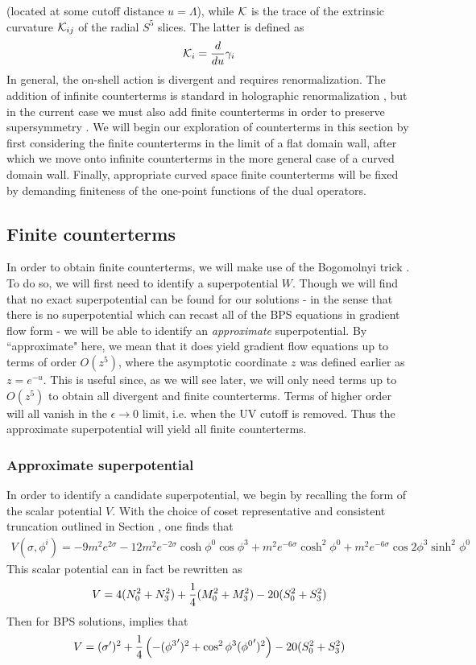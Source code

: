 \documentclass[12pt]{article}
\begin{document}
(located at some cutoff distance $u= \Lambda$), while ${\cal K}$ is the trace of the extrinsic curvature ${\cal K}_{ij}$ of the radial $S^5$ slices. The latter is defined as
\begin{eqnarray}
{\cal K}_{i}=\frac{d}{du} \gamma_{i}
\end{eqnarray}
In general, the on-shell action is divergent and requires renormalization. The addition of infinite counterterms is standard in holographic renormalization   , but in the current case we must also add finite counterterms in order to preserve supersymmetry .  We will begin our exploration of counterterms in this section by first considering the finite counterterms in the limit of a flat domain wall, after which we move onto infinite counterterms in the more general case of a curved domain wall. Finally, appropriate curved space finite counterterms will be fixed by demanding finiteness of the one-point functions of the dual operators.
\subsection{Finite counterterms}
In order to obtain finite counterterms, we will make use of the Bogomolnyi trick . To do so, we will first need to identify a superpotential $W$. Though we will find that no exact superpotential can be found for our solutions - in the sense that there is no superpotential which can recast all of the BPS equations in gradient flow form -  we will be able to identify an \textit{approximate} superpotential. By ``approximate" here, we mean that it does yield gradient flow equations up to terms of order $O(z^5)$, where the asymptotic coordinate $z$ was defined earlier as $z=e^{-u}$. This is useful since, as we will see later, we will only need terms up to $O(z^5)$ to obtain all divergent and finite counterterms. Terms of higher order will all vanish in the $\epsilon \rightarrow 0$ limit, i.e. when the UV cutoff is removed. Thus the approximate superpotential will yield  all finite counterterms. 
\subsubsection{Approximate superpotential}
In order to identify a candidate superpotential, we begin by recalling the form of the scalar potential $V$. With the choice of coset representative and consistent truncation outlined in Section , one finds that
\begin{eqnarray}
V(\sigma,\phi^i) = -9 m^2 e^{2 \sigma }-12m^2 e^{- 2 \sigma} \cosh \phi^0 \cos \phi^3 + m^2 e^{-6 \sigma} \cosh^2 \phi^0+m^2 e^{-6 \sigma} \cos 2 \phi^3 \sinh^2 \phi^0
\nonumber
\end{eqnarray}
 This scalar potential can in fact be rewritten as
\begin{eqnarray}
V = 4 (N_0^2 + N_3^2) + {1 \over 4} (M_0^2 +M_3^2) - 20 (S_0^2 + S_3^2)
\end{eqnarray}
Then for BPS solutions, implies that 
\begin{eqnarray}
V = (\sigma')^2 + {1 \over 4}\left(-({\phi^3}')^2 + \cos^2 \phi^3 ({\phi^0}')^2\right)- 20 (S_0^2 + S_3^2)
\end{eqnarray}
\end{document}
